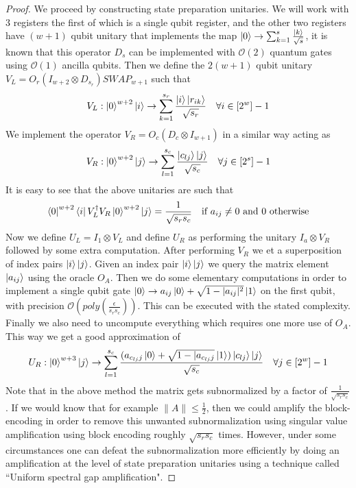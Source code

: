\documentclass[12pt, oneside]{book}
\theoremstyle{definition}
\theoremstyle{definition}
\theoremstyle{remark}
\begin{document}
\begin{proof}
    We proceed by constructing state preparation unitaries. We will work with $3$ registers the first of which is a single qubit register, and the other two registers have $(w+1)$ qubit unitary that implements the map $\ket{0}\rightarrow \sum_{k=1}^s \frac{\ket{k}}{\sqrt{s}}$, it is known that this operator $D_s$ can be implemented with $\mathcal{O}(2)$ quantum gates using $\mathcal{O}(1)$ ancilla qubits. Then we define the $2(w+1)$ qubit unitary $V_L=O_r(I_{w+2}\otimes D_{s_r})SWAP_{w+1}$ such that
    \[
    V_L:\ket{0}^{w+2}\ket{i}\rightarrow \sum_{k=1}^{s_r} \frac{\ket{i}\ket{r_{ik}}}{\sqrt{s_r}}\quad \forall i\in[2^w]-1
    \]
    We implement the operator $V_R=O_c(D_c\otimes I_{w+1})$ in a similar way acting as 
    \[
    V_R:\ket{0}^{w+2}\ket{j}\rightarrow \sum_{l=1}^{s_c}\frac{\ket{c_{lj}}\ket{j}}{\sqrt{s_c}}\quad \forall j \in [2^s]-1
    \]
    It is easy to see that the above unitaries are such that
    \[
    \bra{0}^{w+2}\bra{i}V_L^{\dagger}V_R\ket{0}^{w+2}\ket{j}=\frac{1}{\sqrt{s_rs_c}}\quad \text{if $a_{ij}\neq 0$ and $0$ otherwise}
    \]
    Now we define $U_L=I_1\otimes V_L$ and define $U_R$ as performing the unitary $I_a\otimes V_R$ followed by some extra computation. After performing $V_R$ we et a superposition of index pairs $\ket{i}\ket{j}$. Given an index pair $\ket{i}\ket{j}$ we query the matrix element $\ket{a_{ij}}$ using the oracle $O_A$. Then we do some elementary computations in order to implement a single qubit gate $\ket{0} \rightarrow a_{ij}\ket{0}+\sqrt{1-|a_{ij}|^2}\ket{1}$ on the first qubit, with precision $\mathcal{O}(poly(\frac{\epsilon}{s_rs_c}))$. This can be executed with the stated complexity. Finally we also need to uncompute everything which requires one more use of $O_A$. This way we get a good approximation of 
    \[
    U_R:\ket{0}^{w+3}\ket{j}\rightarrow \sum_{l=1}^{s_c}\frac{(a_{c_{lj}j}\ket{0}+\sqrt{1-|a_{c_{lj}j}}\ket{1})\ket{c_{lj}}\ket{j}}{\sqrt{s_c}}\quad \forall j\in[2^w]-1
    \]
    Note that in the above method the matrix gets subnormalized by a factor of $\frac{1}{\sqrt{s_rs_c}}$. If we would know that for example $\|A\|\leq \frac{1}{2}$, then we could amplify the block-encoding in order to remove this unwanted subnormalization using singular value amplification using block encoding roughly $\sqrt{s_rs_c}$ times. However, under some circumstances one can defeat the subnormalization more efficiently by doing an amplification at the level of state preparation unitaries using a technique called ``Uniform spectral gap amplification".
\end{proof}
\end{document}

